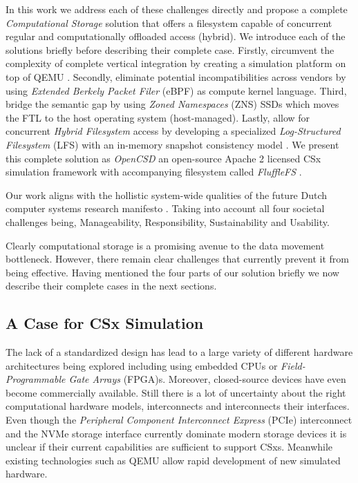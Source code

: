 
In this work we address each of these challenges directly and propose a
complete \textit{Computational Storage} solution that offers a filesystem
capable of concurrent regular and computationally offloaded access (hybrid).
We introduce each of the solutions briefly before describing their complete
case. Firstly, circumvent the complexity of complete vertical integration by
creating a simulation platform on top of QEMU \cite{qemu}. Secondly, eliminate
potential incompatibilities across vendors by using \textit{Extended Berkely
Packet Filer} (eBPF) \cite{what-ebpf} as compute kernel language. Third, bridge
the semantic gap by using \textit{Zoned Namespaces} (ZNS) \cite{zns} SSDs which
moves the FTL to the host operating system (host-managed). Lastly, allow for
concurrent \textit{Hybrid Filesystem} access by developing a specialized
\textit{Log-Structured Filesystem} (LFS) \cite{Rosenblum1992TheDA} with an
in-memory snapshot consistency model \cite{Viotti2016ConsistencyIN}. We present
this complete solution as \textit{OpenCSD} an open-source Apache 2 licensed CSx
simulation framework with accompanying filesystem called \textit{FluffleFS}
\cite{qemu-csd}.

Our work aligns with the hollistic system-wide qualities of the future Dutch
computer systems research manifesto
\cite{Iosup2018MassivizingCS, Iosup2022FutureCS}. Taking into account all four
societal challenges being, Manageability, Responsibility, Sustainability and
Usability.

Clearly computational storage is a promising avenue to the data movement
bottleneck. However, there remain clear challenges that currently prevent it
from being effective. Having mentioned the four parts of our solution briefly we
now describe their complete cases in the next sections.

\subsection{A Case for CSx Simulation}

The lack of a standardized design has lead to a large variety of different
hardware architectures being explored including using embedded CPUs or
\textit{Field-Programmable Gate Arrays} (FPGA)s. Moreover, closed-source
devices have even become commercially available. Still there is a lot of
uncertainty about the right computational hardware models, interconnects and
interconnects their interfaces. Even though the \textit{Peripheral Component
Interconnect Express} (PCIe) interconnect and the NVMe storage interface
currently dominate modern storage devices it is unclear if their current
capabilities are sufficient to support CSxs. Meanwhile existing technologies
such as QEMU allow rapid development of new simulated hardware.

